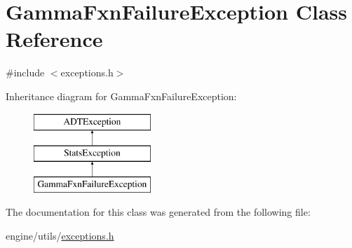 \hypertarget{classGammaFxnFailureException}{
\section{GammaFxnFailureException Class Reference}
\label{classGammaFxnFailureException}
}


{\ttfamily \#include $<$exceptions.h$>$}

Inheritance diagram for GammaFxnFailureException:\begin{figure}[H]
\begin{center}
\leavevmode
\includegraphics[height=3cm]{classGammaFxnFailureException}
\end{center}
\end{figure}


The documentation for this class was generated from the following file:\begin{DoxyCompactItemize}
\item 
engine/utils/\hyperlink{exceptions_8h}{exceptions.h}\end{DoxyCompactItemize}
